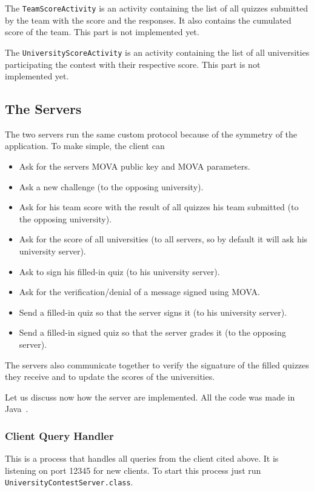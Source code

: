     The \texttt{TeamScoreActivity} is an activity containing the list of all quizzes submitted by the team with the score and the responses. It also contains the cumulated score of the team.
    This part is not implemented yet.

    The \texttt{UniversityScoreActivity} is an activity containing the list of all universities participating the contest with their respective score.
    This part is not implemented yet.

    \subsection{The Servers}
    The two servers run the same custom protocol because of the symmetry of the application. To make simple, the client can
    \begin{itemize}
        \item Ask for the servers MOVA public key and MOVA parameters.
        \item Ask a new challenge (to the opposing university).
        \item Ask for his team score with the result of all quizzes his team submitted (to the opposing university).
        \item Ask for the score of all universities (to all servers, so by default it will ask his university server).
        \item Ask to sign his filled-in quiz (to his university server).
        \item Ask for the verification/denial of a message signed using MOVA.
        \item Send a filled-in quiz so that the server signs it (to his university server).
        \item Send a filled-in signed quiz so that the server grades it (to the opposing server).
    \end{itemize}
    The servers also communicate together to verify the signature of the filled quizzes they receive and to update the scores of the universities. 

    Let us discuss now how the server are implemented. All the code was made in Java~\cite{cite:java}.
    
    \subsubsection{Client Query Handler}
    This is a process that handles all queries from the client cited above. It is listening on port 12345 for new clients. 
    To start this process just run \texttt{UniversityContestServer.class}.
    
